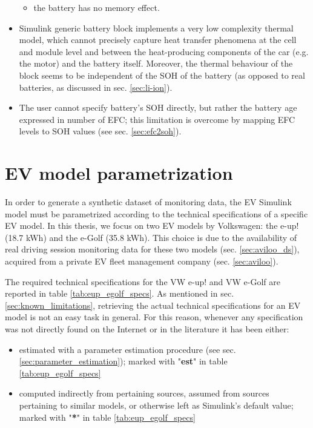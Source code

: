 \begin{itemize}
\begin{itemize}
        \item the battery has no memory effect.
    \end{itemize}
    \item Simulink generic battery block implements a very low complexity thermal model, which cannot precisely capture heat transfer phenomena at the cell and module level and between the heat-producing components of the car (e.g. the motor) and the battery itself. Moreover, the thermal behaviour of the block seems to be independent of the SOH of the battery (as opposed to real batteries, as discussed in sec. \ref{sec:li-ion}). %
    \item The user cannot specify battery's SOH directly, but rather the battery age expressed in number of EFC; this limitation is overcome by mapping EFC levels to SOH values (see sec. \ref{sec:efc2soh}).
\end{itemize}





\section{EV model parametrization}
\label{sec:model_parametrization}
In order to generate a synthetic dataset of monitoring data, the EV Simulink model must be parametrized according to the technical specifications of a specific EV model. In this thesis, we focus on two EV models by Volkswagen: the e-up! (18.7 kWh) and the e-Golf (35.8 kWh). This choice is due to the availability of real driving session monitoring data for these two models (sec. \ref{sec:aviloo_ds}), acquired from a private EV fleet management company (sec. \ref{sec:aviloo}).

The required technical specifications for the VW e-up! and VW e-Golf are reported in table \ref{tab:eup_egolf_specs}. As mentioned in sec. \ref{sec:known_limitations}, retrieving the actual technical specifications for an EV model is not an easy task in general. For this reason, whenever any specification was not directly found on the Internet or in the literature it has been either:
\begin{itemize}
\item estimated with a parameter estimation procedure (see sec. \ref{sec:parameter_estimation}); marked with "\textbf{est}" in table \ref{tab:eup_egolf_specs}
\item computed indirectly from pertaining sources, assumed from sources pertaining to similar models, or otherwise left as Simulink's default value; marked with "\textbf{*}" in table \ref{tab:eup_egolf_specs}
\end{itemize}





